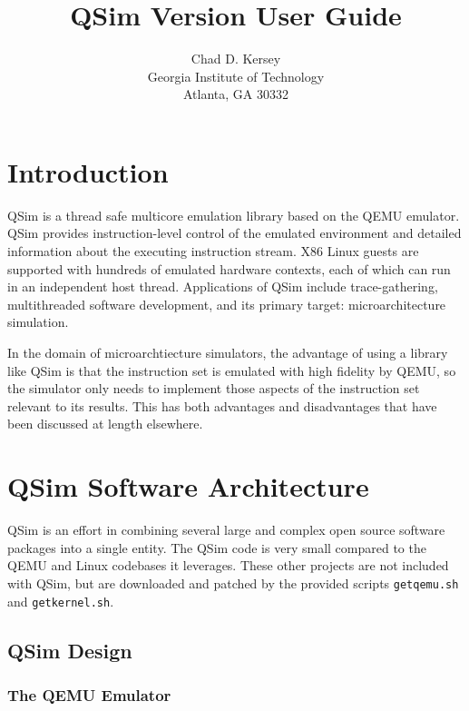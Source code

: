 \documentclass[letterpaper, 10pt]{book}
\title{QSim Version \version User Guide}
\author{Chad D. Kersey\\ Georgia Institute of Technology\\ Atlanta, GA 30332}
\begin{document}
\maketitle

\setcounter{tocdepth}{1}
\tableofcontents

\chapter*{Introduction}
QSim is a thread safe multicore emulation library based on the QEMU emulator.
QSim provides instruction-level control of the emulated environment and 
detailed information about the executing instruction stream. X86 Linux guests
are supported with hundreds of emulated hardware contexts, each of which can run
in an independent host thread. Applications of QSim include trace-gathering,
multithreaded software development, and its primary target: microarchitecture
simulation.

In the domain of microarchtiecture simulators, the advantage of using a library
like QSim is that the instruction set is emulated with high fidelity by QEMU, so
the simulator only needs to implement those aspects of the instruction set
relevant to its results. This has both advantages and disadvantages that have
been discussed at length elsewhere.


\chapter{QSim Software Architecture} \label{chap:arch}
QSim is an effort in combining several large and complex open source software
packages into a single entity. The QSim code is very small compared to the
QEMU and Linux codebases it leverages. These other projects are not included
with QSim, but are downloaded and patched by the provided scripts
\texttt{getqemu.sh} and \texttt{getkernel.sh}.

\section{QSim Design}

\subsection{The QEMU Emulator}
\end{document}
